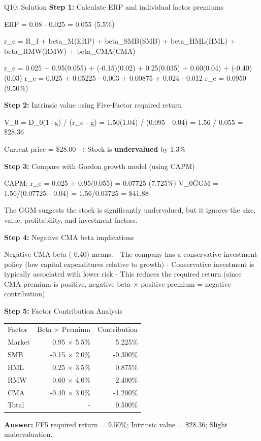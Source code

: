 \documentclass{beamer}
\renewcommand{\scriptsize}{\fontsize{6pt}{7pt}\selectfont}
\begin{document}
	\begin{frame}{Q10: Solution}
		\scriptsize
		\textbf{Step 1:} Calculate ERP and individual factor premiums
		
		ERP = 0.08 - 0.025 = 0.055 (5.5\%)
		
		r\_e = R\_f + beta\_M(ERP) + beta\_SMB(SMB) + beta\_HML(HML) + beta\_RMW(RMW) + beta\_CMA(CMA)
		
		r\_e = 0.025 + 0.95(0.055) + (-0.15)(0.02) + 0.25(0.035) + 0.60(0.04) + (-0.40)(0.03)
		r\_e = 0.025 + 0.05225 - 0.003 + 0.00875 + 0.024 - 0.012
		r\_e = 0.0950 (9.50\%)
		
		\vspace{2pt}
		\textbf{Step 2:} Intrinsic value using Five-Factor required return
		
		V\_0 = D\_0(1+g) / (r\_e - g) = 1.50(1.04) / (0.095 - 0.04) = 1.56 / 0.055 = \$28.36
		
		Current price = \$28.00 → Stock is \textbf{undervalued} by 1.3\%
		
		\vspace{2pt}
		\textbf{Step 3:} Compare with Gordon growth model (using CAPM)
		
		CAPM: r\_e = 0.025 + 0.95(0.055) = 0.07725 (7.725\%)
		V\_0\^{GGM} = 1.56/(0.07725 - 0.04) = 1.56/0.03725 = \$41.88
		
		The GGM suggests the stock is significantly undervalued, but it ignores the size, value, profitability, and investment factors.
		
		\vspace{2pt}
		\textbf{Step 4:} Negative CMA beta implications
		
		Negative CMA beta (-0.40) means:
		- The company has a conservative investment policy (low capital expenditures relative to growth)
		- Conservative investment is typically associated with lower risk
		- This reduces the required return (since CMA premium is positive, negative beta × positive premium = negative contribution)
		
		\vspace{2pt}
		\textbf{Step 5:} Factor Contribution Analysis
		
		\begin{tabular}{lrr}
			Factor & Beta × Premium & Contribution \\
			Market & 0.95 × 5.5\% & 5.225\% \\
			SMB & -0.15 × 2.0\% & -0.300\% \\
			HML & 0.25 × 3.5\% & 0.875\% \\
			RMW & 0.60 × 4.0\% & 2.400\% \\
			CMA & -0.40 × 3.0\% & -1.200\% \\
			Total & - & 9.500\% \\
		\end{tabular}
		
		\textbf{Answer:} FF5 required return = 9.50\%; Intrinsic value = \$28.36; Slight undervaluation.
	\end{frame}
	
\end{document}
